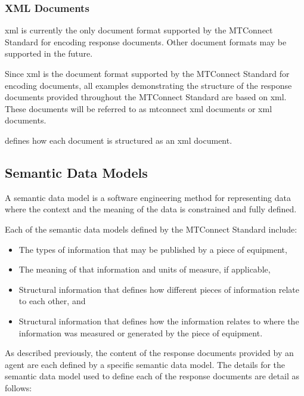 \subsubsection{XML Documents}
\label{sec:XML Documents}

\gls{xml} is currently the only document format supported by the MTConnect Standard for encoding \glspl{response document}.  Other document formats may be supported in the future.   

Since \gls{xml} is the document format supported by the MTConnect Standard for encoding documents, all examples demonstrating the structure of the \glspl{response document} provided throughout the MTConnect Standard are based on \gls{xml}.  These documents will be referred to as \glspl{mtconnect xml document} or \glspl{xml document}.

 defines how each document is structured as an \gls{xml document}.

\subsection{Semantic Data Models}

A \gls{semantic data model} is a software engineering method for representing data where the context and the meaning of the data is constrained and fully defined.

Each of the \glspl{semantic data model} defined by the MTConnect Standard include:

\begin{itemize}
\item The types of information that may be published by a piece of equipment,

\item The meaning of that information and units of measure, if applicable,

\item Structural information that defines how different pieces of information relate to each other, and

\item Structural information that defines how the information relates to where the information was measured or generated by the piece of equipment.
\end{itemize}

As described previously, the content of the \glspl{response document} provided by an \gls{agent} are each defined by a specific \gls{semantic data model}.  The details for the \gls{semantic data model} used to define each of the \glspl{response document} are detail as follows:

